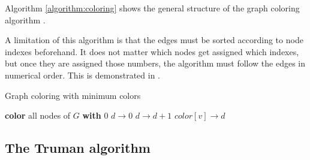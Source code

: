 \documentclass[conference]{IEEEtran}
\begin{document}
Algorithm \autoref{algorithm:coloring} shows the general structure of the graph coloring algorithm  \cite{mittal2011graph} \cite{vernize2013dissertation}.

A limitation of this algorithm is that the edges must be sorted according to node indexes beforehand.
It does not matter which nodes get assigned which indexes, but once they are assigned those numbers, the algorithm must follow the edges in numerical order.
This is demonstrated in \cite{vernize2013dissertation}.

\begin{algorithm}
\caption{Graph coloring with minimum colors}\label{algorithm:coloring}
\begin{algorithmic}[1]


\State \textbf{color} all nodes of $G$ \textbf{with} 0
\State $d \rightarrow 0$
			\State $d \rightarrow d+1$
		\EndIf
		\State $color[v] \rightarrow d$
	\EndIf
\EndFor


\EndFunction
\end{algorithmic}
\end{algorithm}

\subsection{The Truman algorithm}
\label{section:trustmanagement}



\end{document}
